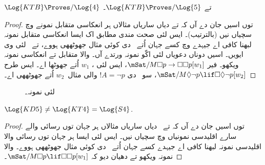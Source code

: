 \documentclass[../../../include/open-logic-section]{subfiles}
\begin{document}
\begin{thm}
  $\Log{KTB} \Proves/ \Log{4}$ تے $\Log{KTB} \Proves/ \Log{5}$۔
\end{thm}

\begin{proof}
   توں اسیں جان دے آں کہ
   تے  دیاں ساریاں مثالاں ہر انعکاسی متقابل نمونے وچ سچیاں نیں (بالترتیب)۔ ایس لئی صحت مندی مطابق اک ایسا انعکاسی متقابل نمونہ لبھنا کافی اے جیہدے وچ کسے جہان اُتے~ دی کوئی مثال جھوٹھھی ہووے، تے~ لئی وی ایویں۔ اسیں دوناں دعویاں لئی اکّو نمونہ ورتدے آں۔
   والا متقابل تے انعکاسی نمونہ ویکھو۔ فیر $\mSat/{M}{\Box p \to \Box \Box
    p}[w_1]$، ایس لئی ، $w_1$ اُتے جھوٹھا اے۔ ایس طرح $\mSat/{M}{\Diamond
    \lnot p \lif \Box \Diamond \lnot p}[w_2]$، سو~ دی $!A = \lnot p$ والی مثال~$w_2$ اُتے جھوٹھھی اے۔
\end{proof}

\begin{figure}[htpb]
  \centering
  \caption{ لئی نمونہ۔}
\end{figure}

\begin{thm}
  $\Log{KD5} \neq \Log{KT4} = \Log{S4}$.
\end{thm}

\begin{proof}
   توں اسیں جان دے آں کہ
   تے~ دیاں ساریاں مثالاں ہر جہان توں رسائی والے سارے اقلیدسی نمونیاں وچ سچیاں نیں۔ ایس لئی ایسا ہر جہان توں رسائی والا اقلیدسی نمونہ لبھنا کافی اے جیہدے کسے جہان اُتے~ دی کوئی مثال جھوٹھھی ہووے۔
   والا نمونہ ویکھو تے دھیان دیو کہ $\mSat/{M}{\Box p
  \lif \Box\Box p}[w_1]$۔
\end{proof}
\end{document}
